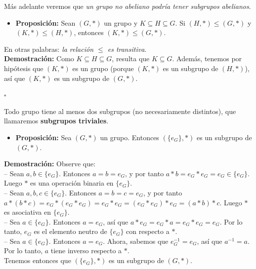 \documentclass[10 pt]{article}
\begin{document}
\Large{Más adelante veremos que \textit{un grupo no abeliano podría tener subgrupos abelianos}.} \\

\begin{itemize}
    \item \Large{\textbf{Proposición:} Sean $(G,*)$ un grupo y $K \subseteq H \subseteq G$. Si $(H,*) \leq (G,*)$ y $(K,*) \leq (H,*)$, entonces $(K,*) \leq (G,*)$.} \\
\end{itemize}

\Large{En otras palabras: \textit{la relación $\leq$ es transitiva}.} \\

\Large{\textbf{Demostración:} Como $K \subseteq H \subseteq G$, resulta que $K \subseteq G$. Además, tenemos por hipótesis que $(K,*)$ es un grupo (porque $(K,*)$ es un subgrupo de $(H,*)$), así que $(K,*)$ es un subgrupo de $(G,*)$.} \\

\begin{flushright}
    $\square$
\end{flushright}

\Large{Todo grupo tiene al menos dos subgrupos (no necesariamente distintos), que llamaremos \textbf{subgrupos triviales}.} \\

\begin{itemize}
    \item \Large{\textbf{Proposición:} Sea $(G,*)$ un grupo. Entonces $(\{e_G\},*)$ es un subgrupo de $(G,*)$.} \\
\end{itemize}

\Large{\textbf{Demostración:} Observe que: \\

-- Sean $a,b \in \{e_G\}$. Entonces $a=b=e_G$, y por tanto $a*b=e_G*e_G=e_G \in \{e_G\}$. Luego $*$ es una operación binaria en $\{e_G\}$. \\

-- Sean $a,b,c \in \{e_G\}$. Entonces $a=b=c=e_G$, y por tanto $a*(b*c)=e_G*(e_G*e_G)=e_G*e_G=(e_G*e_G)*e_G=(a*b)*c$. Luego $*$ es asociativa en $\{e_G\}$. \\

-- Sea $a \in \{e_G\}$. Entonces $a=e_G$, así que $a*e_G=e_G*a=e_G*e_G=e_G$. Por lo tanto, $e_G$ es el elemento neutro de $\{e_G\}$ con respecto a $*$. \\

-- Sea $a \in \{e_G\}$. Entonces $a=e_G$. Ahora, sabemos que $e_G^{-1}=e_G$, así que $a^{-1}=a$. Por lo tanto, $a$ tiene inverso respecto a $*$. \\

Tenemos entonces que $(\{e_G\},*)$ es un subgrupo de $(G,*)$.} \\
\end{document}
